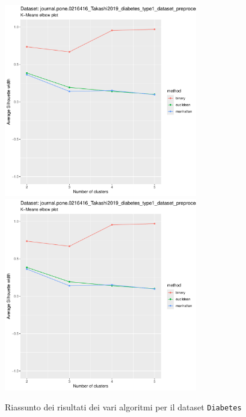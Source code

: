 \documentclass[a4paper, 12pt]{report}
\begin{document}
			\begin{figure}[H]
				\centering
				\includegraphics[width = 0.75\textwidth, height = 0.45\textheight, page = 9]{
					results/results_Diabetes.csv.pdf
				}
				\includegraphics[width = 0.75\textwidth, height = 0.45\textheight, page = 10]{
					results/results_Diabetes.csv.pdf
				}
				\caption{Riassunto dei risultati dei vari algoritmi per il dataset
				\texttt{Diabetes}}
				\label{fig:comp4}
			\end{figure}
\end{document}
